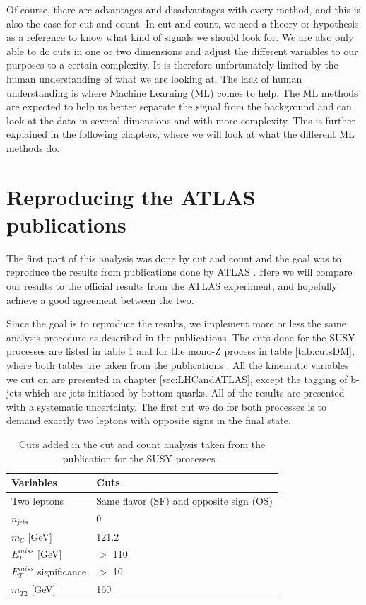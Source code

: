 Of course, there are advantages and disadvantages with every method, and this is also the case for cut and count. In cut and count, we need a theory or hypothesis as a reference to know what kind of signals we should look for. We are also only able to do cuts in one or two dimensions and adjust the different variables to our purposes to a certain complexity. It is therefore unfortunately limited by the human understanding of what we are looking at. The lack of human understanding is where Machine Learning (ML) comes to help. The ML methods are expected to help us better separate the signal from the background and can look at the data in several dimensions and with more complexity. This is further explained in the following chapters, where we will look at what the different ML methods do.






\section{Reproducing the ATLAS publications}
The first part of this analysis was done by cut and count and the goal was to reproduce the results from publications done by ATLAS \cite{sleptonexclusion, monoZexclusion}. Here we will compare our results to the official results from the ATLAS experiment, and hopefully achieve a good agreement between the two.

Since the goal is to reproduce the results, we implement more or less the same analysis procedure as described in the publications. The cuts done for the SUSY processes are listed in table \ref{tab:cutsSUSY} and for the mono-Z process in table \ref{tab:cutsDM}, where both tables are taken from the publications \cite{sleptonexclusion, monoZexclusion}. All the kinematic variables we cut on are presented in chapter \ref{sec:LHCandATLAS}, except the tagging of b-jets which are jets initiated by bottom quarks. All of the results are presented with a systematic uncertainty. The first cut we do for both processes is to demand exactly two leptons with opposite signs in the final state.


\begin{table}[H]
    \centering
    \begin{tabular}{l l}\toprule
    \textbf{Variables} & \textbf{Cuts}\\
    \midrule
    \midrule
    Two leptons & Same flavor (SF) and opposite sign (OS)\\
    $n_{\text{jets}}$     & 0 \\
    $m_{ll}$ [GeV]     & 121.2\\
    $E_T^{miss}$ [GeV] & $>$ 110 \\
    $E_T^{miss}$ significance & $>$ 10\\
    $m_{T2}$ [GeV] & 160\\
    \bottomrule
    \end{tabular}
    \caption{Cuts added in the cut and count analysis taken from the publication for the SUSY processes \cite{sleptonexclusion}.}
    \label{tab:cutsSUSY}
\end{table}

